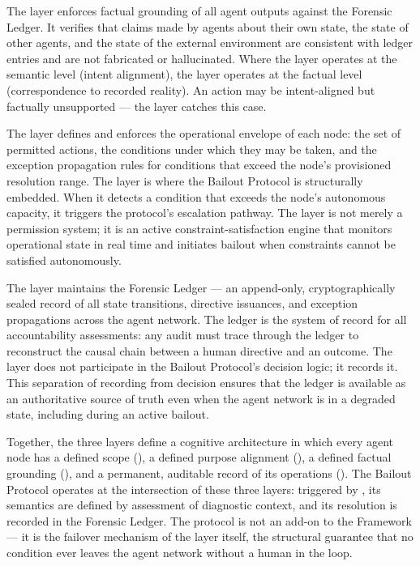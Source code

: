 The \truth{} layer enforces factual grounding of all agent outputs against the Forensic Ledger. It verifies that claims made by agents about their own state, the state of other agents, and the state of the external environment are consistent with ledger entries and are not fabricated or hallucinated. Where the \purpose{} layer operates at the semantic level (intent alignment), the \truth{} layer operates at the factual level (correspondence to recorded reality). An action may be intent-aligned but factually unsupported — the \truth{} layer catches this case.

The \bounds{} layer defines and enforces the operational envelope of each node: the set of permitted actions, the conditions under which they may be taken, and the exception propagation rules for conditions that exceed the node's provisioned resolution range. The \bounds{} layer is where the Bailout Protocol is structurally embedded. When it detects a condition that exceeds the node's autonomous capacity, it triggers the protocol's escalation pathway. The \bounds{} layer is not merely a permission system; it is an active constraint-satisfaction engine that monitors operational state in real time and initiates bailout when constraints cannot be satisfied autonomously.

The \fact{} layer maintains the Forensic Ledger — an append-only, cryptographically sealed record of all state transitions, directive issuances, and exception propagations across the agent network. The ledger is the system of record for all accountability assessments: any audit must trace through the ledger to reconstruct the causal chain between a human directive and an outcome. The \fact{} layer does not participate in the Bailout Protocol's decision logic; it records it. This separation of recording from decision ensures that the ledger is available as an authoritative source of truth even when the agent network is in a degraded state, including during an active bailout.

Together, the three layers define a cognitive architecture in which every agent node has a defined scope (\bounds{}), a defined purpose alignment (\purpose{}), a defined factual grounding (\truth{}), and a permanent, auditable record of its operations (\fact{}). The Bailout Protocol operates at the intersection of these three layers: triggered by \bounds{}, its semantics are defined by \truth{} assessment of diagnostic context, and its resolution is recorded in the Forensic Ledger. The protocol is not an add-on to the \bxthree{} Framework — it is the failover mechanism of the \bounds{} layer itself, the structural guarantee that no condition ever leaves the agent network without a human in the loop.

